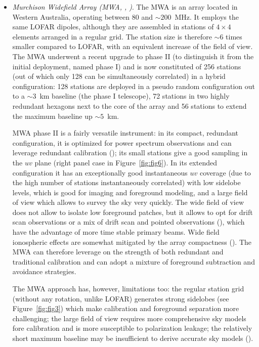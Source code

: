 {\begin{itemize}
The LOFAR design is suited for 21~cm tomography on large angular scales, providing foregrounds are adequately subtracted (\cite{zaroubi12}).

\item {\it Murchison Widefield Array (MWA, \cite{tingay13}, \cite{wayth18})}. The MWA is an array located in Western Australia, operating between 80 and $\sim 200$~MHz. It employs the same LOFAR dipoles, although they are assembled in stations of $4 \times 4$ elements arranged in a regular grid. The station size is therefore $\sim 6$ times smaller compared to LOFAR, with an equivalent increase of the field of view. 
The MWA underwent a recent upgrade to phase II (to distinguish it from the initial deployment, named phase I) and is now constituted of 256 stations (out of which only 128 can be simultaneously correlated) in a hybrid configuration: 128 stations are deployed in a pseudo random configuration out to a $\sim 3$~km baseline (the phase I telescope), 72 stations in two highly redundant hexagons next to the core of the array and 56 stations to extend the maximum baseline up $\sim 5$~km. 

MWA phase II is a fairly versatile instrument: in its compact, redundant configuration, it is optimized for power spectrum observations and can leverage redundant calibration (\cite{li18}); its small stations give a good sampling in the $uv$ plane (right panel case in Figure~\ref{fig:fig6}). In its extended configuration it has an exceptionally good instantaneous $uv$ coverage (due to the high number of stations instantaneously correlated) with low sidelobe levels, which is good for imaging and foreground modeling, and a large field of view which allows to survey the sky very quickly. The wide field of view does not allow to isolate low foreground patches, but it allows to opt for drift scan observations or a mix of drift scan and pointed observations (\cite{trott14}), which have the advantage of more time stable primary beams. Wide field ionospheric effects are somewhat mitigated by the array compactness (\cite{jordan17}).
The MWA can therefore leverage on the strength of both redundant and traditional calibration and can adopt a mixture of foreground subtraction and avoidance strategies.

The MWA approach has, however, limitations too: the regular station grid (without any rotation, unlike LOFAR) generates strong sidelobes (see Figure~\ref{fig:fig3}) which make calibration and foreground separation more challenging; the large field of view requires more comprehensive sky models fore calibration and is more susceptible to polarization leakage; the relatively short maximum baseline may be insufficient to derive accurate sky models (\cite{procopio17}). 


\end{itemize}}
